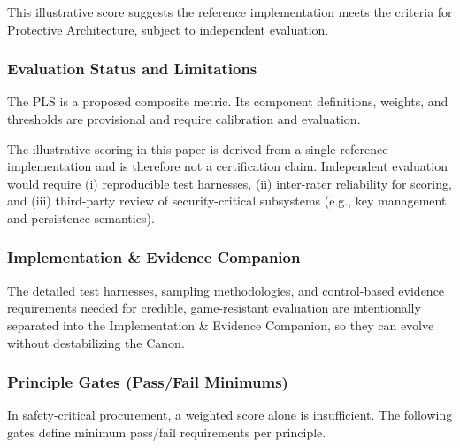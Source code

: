 \documentclass[12pt]{article}
\begin{document}
This illustrative score suggests the reference implementation meets the criteria for Protective Architecture, subject to independent evaluation.

\subsubsection{Evaluation Status and Limitations}
The PLS is a proposed composite metric. Its component definitions, weights, and thresholds are provisional and require calibration and evaluation.

The illustrative scoring in this paper is derived from a single reference implementation and is therefore not a certification claim.
Independent evaluation would require (i) reproducible test harnesses, (ii) inter-rater reliability for scoring, and (iii) third-party review of security-critical subsystems (e.g., key management and persistence semantics).

\subsubsection{Implementation \& Evidence Companion}
The detailed test harnesses, sampling methodologies, and control-based evidence requirements needed for credible, game-resistant evaluation are intentionally separated into the Implementation \& Evidence Companion, so they can evolve without destabilizing the Canon.

\subsubsection{Principle Gates (Pass/Fail Minimums)}
In safety-critical procurement, a weighted score alone is insufficient. The following gates define minimum pass/fail requirements per principle.
\end{document}
